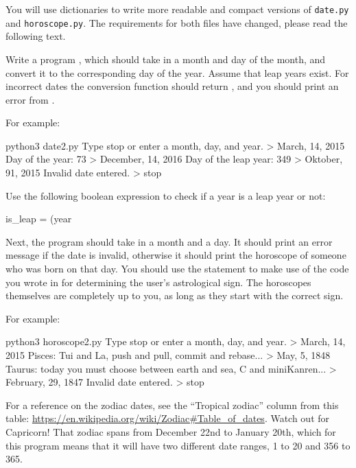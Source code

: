 \documentclass[11pt]{cselabheader}
\begin{document}
\begin{ex}
  You will use dictionaries to write more readable and compact versions of \texttt{date.py} and \texttt{horoscope.py}.
  The requirements for both files have changed, please read the following text.

  Write a program , which should take in a month and
  day of the month, and convert it to the corresponding day of the year.
  Assume that leap years exist. For incorrect dates the conversion function
  should return , and you should print an error from
  .

  For example:

  \begin{bashcode}
python3 date2.py
Type stop or enter a month, day, and year.
> March, 14, 2015
Day of the year: 73
> December, 14, 2016
Day of the leap year: 349
> Oktober, 91, 2015
Invalid date entered.
> stop
  \end{bashcode}

  Use the following boolean expression to check if a year is a leap year or not: 
  \begin{python3code}
is_leap = (year %
  \end{python3code}

  Next, the  program should take in a month and a day. 
  It should print an error message if the date is invalid, otherwise 
  it should print the horoscope of someone who was born on that day. You should use the
   statement to make use of the code you wrote in
   for determining the user's astrological sign. The
  horoscopes themselves are completely up to you, as long as they start with the
  correct sign.

  For example:

  \begin{bashcode}
python3 horoscope2.py
Type stop or enter a month, day, and year.
> March, 14, 2015 
Pisces: Tui and La, push and pull, commit and rebase...
> May, 5, 1848 
Taurus: today you must choose between earth and sea, C and miniKanren...
> February, 29, 1847 
Invalid date entered.
> stop
  \end{bashcode}
  
  For a reference on the zodiac dates, see the ``Tropical zodiac'' column from
  this table: \url{https://en.wikipedia.org/wiki/Zodiac#Table_of_dates}. Watch
  out for Capricorn! That zodiac spans from December 22nd to January 20th, which
  for this program means that it will have two different date ranges, 1 to 20
  and 356 to 365.
\end{ex}
\end{document}

